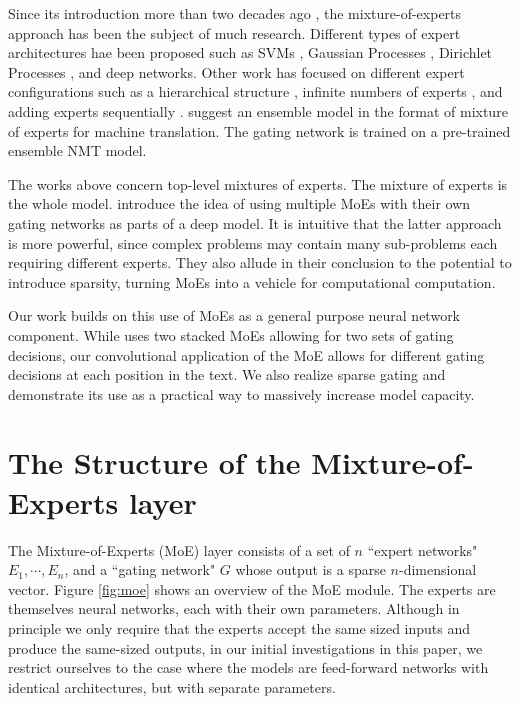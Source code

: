 \documentclass{article}
\begin{document}
Since its introduction more than two decades ago \citep{Jacobs91Adaptive,Jordan1994HME}, the mixture-of-experts approach has been the subject of much research.  Different types of expert architectures hae been proposed such as SVMs \citep{Collobert02PMS}, Gaussian Processes \citep{Tresp2001Mixture,Theis2015Generative,Deisenroth15Distributed}, Dirichlet Processes \citep{Shahbaba09NMU}, and deep networks.  Other work has focused on different expert configurations such as a hierarchical structure \citep{Yao09Hierarchical}, infinite numbers of experts \citep{Rasmussen02Infinite}, and adding experts sequentially \citep{Aljundi16}.  \cite{Garmash2016ensemble} suggest an ensemble model in the format of mixture of experts for machine translation. The gating network is trained on a pre-trained ensemble NMT model.

The works above concern top-level mixtures of experts.  The mixture of experts is the whole model.   \cite{eigen2013learning} introduce the idea of using multiple MoEs with their own gating networks as parts of a deep model.  It is intuitive that the latter approach is more powerful, since complex problems may contain many sub-problems each requiring different experts.  They also allude in their conclusion to the potential to introduce sparsity, turning MoEs into a vehicle for computational computation.  

Our work builds on this use of MoEs as a general purpose neural network component.  While \cite{eigen2013learning} uses two stacked MoEs allowing for two sets of gating decisions, our convolutional application of the MoE allows for different gating decisions at each position in the text.   We also realize sparse gating and demonstrate its use as a practical way to massively increase model capacity.

\section{The Structure of the Mixture-of-Experts layer}\label{sec:gating}

The Mixture-of-Experts (MoE) layer consists of a set of $n$ ``expert networks" $E_1, \cdots, E_n$, and a ``gating network" $G$ whose output is a sparse $n$-dimensional vector.  Figure \ref{fig:moe} shows an overview of the MoE module. The experts are themselves neural networks, each with their own parameters.  Although in principle we only require that the experts accept the same sized inputs and produce the same-sized outputs, in our initial investigations in this paper, we restrict ourselves to the case where the models are feed-forward networks with identical architectures, but with separate parameters.
\end{document}
